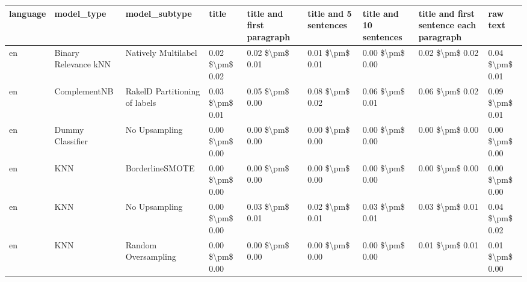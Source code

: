\begin{tabular}{lllllllll}
\toprule
language &                      model\_type &                 model\_subtype &           title & title and first paragraph & title and 5 sentences & title and 10 sentences & title and first sentence each paragraph &            raw text \\
\midrule
      en &            Binary Relevance kNN &           Natively Multilabel & 0.02 \$\textbackslash pm\$ 0.02 &           0.02 \$\textbackslash pm\$ 0.01 &       0.01 \$\textbackslash pm\$ 0.01 &        0.00 \$\textbackslash pm\$ 0.00 &                         0.02 \$\textbackslash pm\$ 0.02 &     0.04 \$\textbackslash pm\$ 0.01 \\
      en &                    ComplementNB & RakelD Partitioning of labels & 0.03 \$\textbackslash pm\$ 0.01 &           0.05 \$\textbackslash pm\$ 0.00 &       0.08 \$\textbackslash pm\$ 0.02 &        0.06 \$\textbackslash pm\$ 0.01 &                         0.06 \$\textbackslash pm\$ 0.02 &     0.09 \$\textbackslash pm\$ 0.01 \\
      en &                Dummy Classifier &                 No Upsampling & 0.00 \$\textbackslash pm\$ 0.00 &           0.00 \$\textbackslash pm\$ 0.00 &       0.00 \$\textbackslash pm\$ 0.00 &        0.00 \$\textbackslash pm\$ 0.00 &                         0.00 \$\textbackslash pm\$ 0.00 &     0.00 \$\textbackslash pm\$ 0.00 \\
      en &                             KNN &               BorderlineSMOTE & 0.00 \$\textbackslash pm\$ 0.00 &           0.00 \$\textbackslash pm\$ 0.00 &       0.00 \$\textbackslash pm\$ 0.00 &        0.00 \$\textbackslash pm\$ 0.00 &                         0.00 \$\textbackslash pm\$ 0.00 &     0.00 \$\textbackslash pm\$ 0.00 \\
      en &                             KNN &                 No Upsampling & 0.00 \$\textbackslash pm\$ 0.00 &           0.03 \$\textbackslash pm\$ 0.01 &       0.02 \$\textbackslash pm\$ 0.01 &        0.03 \$\textbackslash pm\$ 0.01 &                         0.03 \$\textbackslash pm\$ 0.01 &     0.04 \$\textbackslash pm\$ 0.02 \\
      en &                             KNN &           Random Oversampling & 0.00 \$\textbackslash pm\$ 0.00 &           0.00 \$\textbackslash pm\$ 0.00 &       0.00 \$\textbackslash pm\$ 0.00 &        0.00 \$\textbackslash pm\$ 0.00 &                         0.01 \$\textbackslash pm\$ 0.01 &     0.01 \$\textbackslash pm\$ 0.00 \\

\end{tabular}
